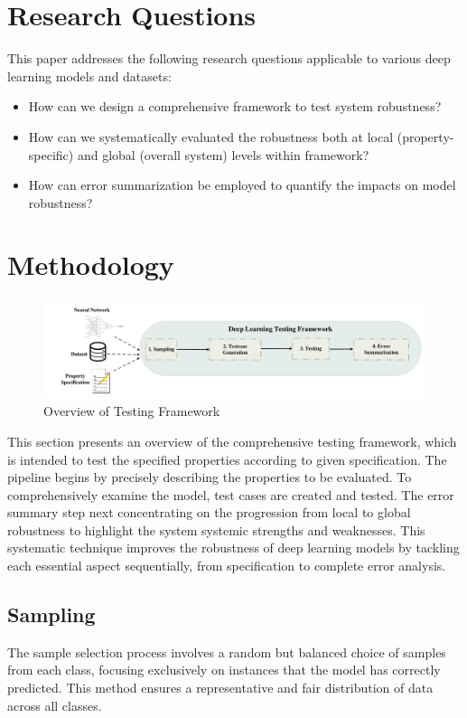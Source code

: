 \documentclass[10pt, conference, a4paper, final]{IEEEtran}
\begin{document}
\section{Research Questions}

This paper addresses the following research questions applicable to various deep learning models and datasets:

\begin{itemize}
    \item How can we design a comprehensive framework to test system robustness?
    \item How can we systematically evaluated the robustness both at local (property-specific) and global (overall system) levels within framework?
    \item How can error summarization be employed to quantify the impacts on model robustness?
 
\end{itemize}


\section{Methodology}
\begin{figure}{}
    \centering
    \includegraphics[width=\linewidth]{paper_images/DL framework.pdf}
    \caption{Overview of Testing Framework}
    \label{fig:graph}
\end{figure}


This section presents an overview of the comprehensive testing framework, which is intended to test the specified properties according to given specification. The pipeline begins by precisely describing the properties to be evaluated. To comprehensively examine the model, test cases are created and tested. The error summary step next concentrating on the progression from local to global robustness to highlight the system systemic strengths and weaknesses. This systematic technique improves the robustness of deep learning models by tackling each essential aspect sequentially, from specification to complete error analysis.

\subsection{Sampling}
 The sample selection process involves a random but balanced choice of samples from each class, focusing exclusively on instances that the model has correctly predicted. This method ensures a representative and fair distribution of data across all classes.
\end{document}
